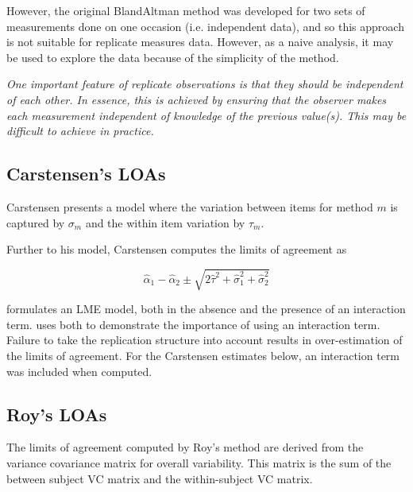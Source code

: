 \documentclass[12pt, a4paper]{report}
\theoremstyle{plain}
\theoremstyle{definition}
\theoremstyle{remark}
\begin{document}
However, the original BlandAltman method was developed for two sets of measurements done on one occasion (i.e. independent data), and so this approach is not suitable for replicate measures data. However, as a naive analysis, it may be used to explore the data because of the simplicity of the method.
	
	\emph{
		One important feature of replicate observations is that they should be independent
		of each other. In essence, this is achieved by ensuring that the observer makes each
		measurement independent of knowledge of the previous value(s). This may be difficult
		to achieve in practice.}
	
	
	\subsection{Carstensen's LOAs}
	
	
	Carstensen presents a model where the variation between items for
	method $m$ is captured by $\sigma_m$ and the within item variation
	by $\tau_m$.
	
	Further to his model, Carstensen computes the limits of agreement
	as
	
	\[
	\hat{\alpha}_1 - \hat{\alpha}_2 \pm \sqrt{2 \hat{\tau}^2 +
		\hat{\sigma}^2_1 + \hat{\sigma}^2_2}
	\]
	
	
	\citet{BXC2008} formulates an LME model, both in the absence and the presence of an interaction term.\citet{BXC2008} uses both to demonstrate the importance of using an interaction term. Failure to take the replication structure into
	account results in over-estimation of the limits of agreement. For the Carstensen estimates below, an interaction term was included when computed.
	\newpage
	
	
	
	
	
	
	\newpage
	
	\subsection{Roy's LOAs}
	
	The limits of agreement computed by Roy's method are derived from the variance covariance matrix for overall variability.
	This matrix is the sum of the between subject VC matrix and the within-subject VC matrix.
	
\end{document}
